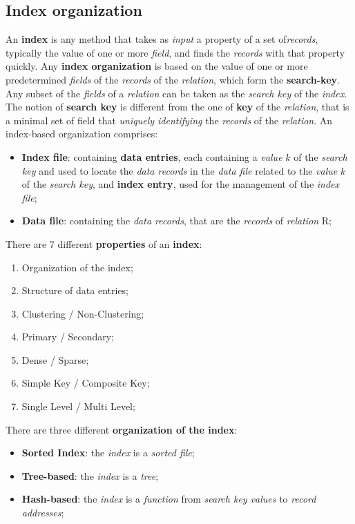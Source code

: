 \documentclass{article}
\begin{document}
\subsection{Index organization}
An \textbf{index} is any method that takes as \emph{input} a property of a set of\emph{records}, typically the value of one or more \emph{field}, and finds the \emph{records} with that property quickly. Any \textbf{index organization} is based on the value of one or more predetermined \emph{fields} of the \emph{records} of the \emph{relation}, which form the \textbf{search-key}. Any subset of the \emph{fields} of a \emph{relation} can be taken as the \emph{search key} of the \emph{index}. The notion of \textbf{search key} is different from the one of \textbf{key} of the \emph{relation}, that is a minimal set of field that \emph{uniquely identifying} the \emph{records} of the \emph{relation}. An index-based organization comprises:
\begin{itemize}
\item \textbf{Index file}: containing \textbf{data entries}, each containing a \emph{value} $k$ of the \emph{search key} and used to locate the \emph{data records} in the \emph{data file }related to the \emph{value} $k$ of the \emph{search key}, and \textbf{index entry}, used for the management of the \emph{index file};
\item \textbf{Data file}: containing the \emph{data records}, that are the \emph{records} of \emph{relation} R;
\end{itemize}
There are 7 different \textbf{properties} of an \textbf{index}:
\begin{enumerate}
\item Organization of the index;
\item Structure of data entries;
\item Clustering / Non-Clustering;
\item Primary / Secondary;
\item Dense / Sparse;
\item Simple Key / Composite Key;
\item Single Level / Multi Level;
\end{enumerate}
There are three different \textbf{organization of the index}:
\begin{itemize}
\item \textbf{Sorted Index}: the \emph{index} is a \emph{sorted file};
\item \textbf{Tree-based}: the \emph{index} is a \emph{tree};
\item \textbf{Hash-based}: the \emph{index} is a \emph{function} from \emph{search key values} to \emph{record addresses};
\end{itemize}
\end{document}
